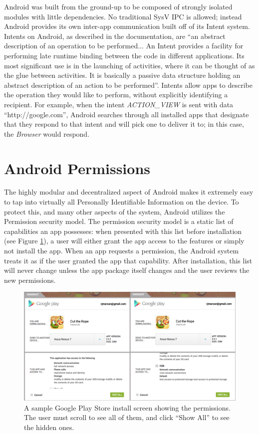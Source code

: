 Android was built from the ground-up to be composed of strongly isolated modules with little dependencies. No traditional SysV IPC is allowed; instead Android provides its own inter-app communication built off of its Intent system. Intents on Android, as described in the documentation, are ``an abstract description of an operation to be performed... An Intent provides a facility for performing late runtime binding between the code in different applications. Its most significant use is in the launching of activities, where it can be thought of as the glue between activities. It is basically a passive data structure holding an abstract description of an action to be performed''\citep{androidintents}. Intents allow apps to describe the operation they would like to perform, without explicitly identifying a recipient. For example, when the intent \textit{ACTION\_VIEW} is sent with data ``http://google.com'', Android searches through all installed apps that designate that they respond to that intent and will pick one to deliver it to; in this case, the \textit{Browser} would respond.

\section{Android Permissions}
The highly modular and decentralized aspect of Android makes it extremely easy to tap into virtually all Personally Identifiable Information on the device. To protect this, and many other aspects of the system, Android utilizes the Permission security model. The permission security model is a static list of capabilities an app possesses: when presented with this list before installation (see Figure \ref{fig:gpstorepermissions}), a user will either grant the app access to the features or simply not install the app. When an app requests a permission, the Android system treats it as if the user granted the app that capability. After installation, this list will never change unless the app package itself changes and the user reviews the new permissions.

\begin{figure}[h]
\begin{center}
\includegraphics[width=1.0\columnwidth]{figs/GPStoreInstallScreen}
\caption{A sample Google Play Store install screen showing the permissions. The user must scroll to see all of them, and click ``Show All'' to see the hidden ones.}
\label{fig:gpstorepermissions}
\end{center}
\end{figure}

